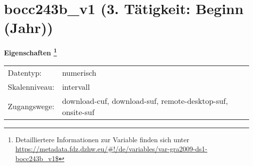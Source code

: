 
    \setcounter{footnote}{0}

    \vspace*{-1.8cm}
	\section{bocc243b\_v1 (3. Tätigkeit: Beginn (Jahr))}
	\label{section:bocc243b_v1}



    \vspace*{0.5cm}
    \noindent\textbf{Eigenschaften
	\footnote{Detailliertere Informationen zur Variable finden sich unter
		\url{https://metadata.fdz.dzhw.eu/\#!/de/variables/var-gra2009-ds1-bocc243b_v1$}}}\\
	\begin{tabularx}{\hsize}{@{}lX}
	Datentyp: & numerisch \\
	Skalenniveau: & intervall \\
	Zugangswege: &
	  download-cuf, 
	  download-suf, 
	  remote-desktop-suf, 
	  onsite-suf
 \\
    \end{tabularx}



